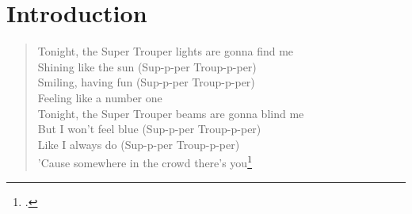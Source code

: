 \documentclass[
    12pt,
    twoside,
    bibstyle=chicago,
    headerstyle=uppercase,
	bibfile=biblatex_updating.bib
]{reedthesis}
\begin{document}
	
	
  \mainmatter %
  \pagestyle{fancyplain} %


    \chapter*{Introduction}

 \begin{quote}
Tonight, the Super Trouper lights are gonna find me\\
Shining like the sun (Sup-p-per Troup-p-per)\\
Smiling, having fun (Sup-p-per Troup-p-per)\\
Feeling like a number one\\

Tonight, the Super Trouper beams are gonna blind me \\
But I won't feel blue (Sup-p-per Troup-p-per)\\
Like I always do (Sup-p-per Troup-p-per)\\
'Cause somewhere in the crowd there's you\footcite{ABBASuperTrouper}
\end{quote}

\doublespacing
\end{document}

